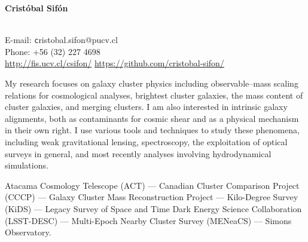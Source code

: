 \documentclass[11pt]{article}
\begin{document}
\begin{minipage}[b]{0.46\linewidth}
\flushleft
\hspace{-0.7cm}
{\bf\huge Crist\'obal Sif\'on}\\\vspace{0.2cm}
\\
\end{minipage}
\begin{minipage}[b]{0.49\linewidth}
\flushright
{\large E-mail: {\texttt cristobal.sifon@pucv.cl}\\
        Phone: +56 (32) 227 4698\\
        \url{http://fis.ucv.cl/csifon/}
        \url{https://github.com/cristobal-sifon/}}
\end{minipage}
\vspace{0.4cm}
\hline




My research focuses on galaxy cluster physics including observable--mass scaling 
relations for cosmological analyses, brightest cluster galaxies, the mass 
content of cluster galaxies, and merging clusters. I am also interested in 
intrinsic galaxy alignments, both as contaminants for cosmic shear and as a 
physical mechanism in their own right. I use various tools and techniques to 
study these phenomena, including weak gravitational lensing, spectroscopy, the 
exploitation of optical surveys in general, and most recently analyses involving 
hydrodynamical simulations.

\vspace{0.5cm}
{
 Atacama Cosmology Telescope (ACT) ---
 Canadian Cluster Comparison Project (CCCP) ---
 Galaxy Cluster Mass Reconstruction Project ---
 Kilo-Degree Survey (KiDS) ---
 Legacy Survey of Space and Time Dark Energy Science Collaboration (LSST-DESC) ---
 Multi-Epoch Nearby Cluster Survey (MENeaCS) ---
 Simons Observatory.
}
\end{document}
